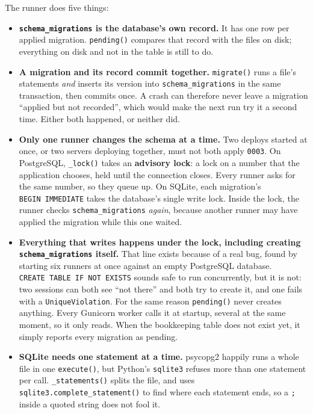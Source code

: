 \noindent{}The runner does five things:

\begin{itemize}
\tightlist
\item
  \textbf{\texttt{schema\_migrations} is the database's own record.} It has one row per applied migration. \texttt{pending()} compares that record with the files on disk; everything on disk and not in the table is still to do.
\item
  \textbf{A migration and its record commit together.} \texttt{migrate()} runs a file's statements \emph{and} inserts its version into \texttt{schema\_migrations} in the same transaction, then commits once. A crash can therefore never leave a migration ``applied but not recorded'', which would make the next run try it a second time. Either both happened, or neither did.
\item
  \textbf{Only one runner changes the schema at a time.} Two deploys started at once, or two servers deploying together, must not both apply \texttt{0003}. On PostgreSQL, \texttt{\_lock()} takes an \textbf{advisory lock}: a lock on a number that the application chooses, held until the connection closes. Every runner asks for the same number, so they queue up. On SQLite, each migration's \texttt{BEGIN\ IMMEDIATE} takes the database's single write lock. Inside the lock, the runner checks \texttt{schema\_migrations} \emph{again}, because another runner may have applied the migration while this one waited.
\item
  \textbf{Everything that writes happens under the lock, including creating \texttt{schema\_migrations} itself.} That line exists because of a real bug, found by starting six runners at once against an empty PostgreSQL database. \texttt{CREATE\ TABLE\ IF\ NOT\ EXISTS} sounds safe to run concurrently, but it is not: two sessions can both see ``not there'' and both try to create it, and one fails with a \texttt{UniqueViolation}. For the same reason \texttt{pending()} never creates anything. Every Gunicorn worker calls it at startup, several at the same moment, so it only reads. When the bookkeeping table does not exist yet, it simply reports every migration as pending.
\item
  \textbf{SQLite needs one statement at a time.} psycopg2 happily runs a whole file in one \texttt{execute()}, but Python's \texttt{sqlite3} refuses more than one statement per call. \texttt{\_statements()} splits the file, and uses \texttt{sqlite3.}\allowbreak{}\texttt{complete\_}\allowbreak{}\texttt{statement()} to find where each statement ends, so a \texttt{;} inside a quoted string does not fool it.
\end{itemize}

